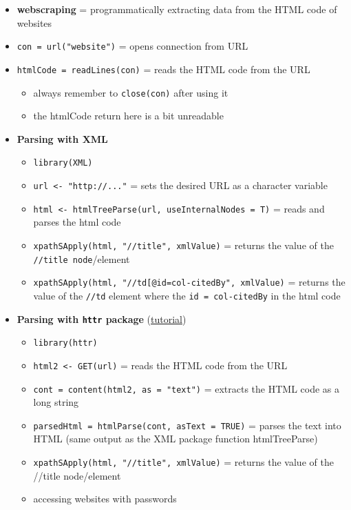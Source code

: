\documentclass[
]{article}
\providecommand{\tightlist}{%
  \setlength{\itemsep}{0pt}\setlength{\parskip}{0pt}}
\begin{document}
\begin{itemize}
\tightlist
\item
  \textbf{webscraping} = programmatically extracting data from the HTML
  code of websites
\item
  \texttt{con\ =\ url("website")} = opens connection from URL
\item
  \texttt{htmlCode\ =\ readLines(con)} = reads the HTML code from the
  URL

  \begin{itemize}
  \tightlist
  \item
    always remember to \texttt{close(con)} after using it
  \item
    the htmlCode return here is a bit unreadable
  \end{itemize}
\item
  \textbf{Parsing with XML}

  \begin{itemize}
  \tightlist
  \item
    \texttt{library(XML)}
  \item
    \texttt{url\ \textless{}-\ "http://..."} = sets the desired URL as a
    character variable
  \item
    \texttt{html\ \textless{}-\ htmlTreeParse(url,\ useInternalNodes\ =\ T)}
    = reads and parses the html code
  \item
    \texttt{xpathSApply(html,\ "//title",\ xmlValue)} = returns the
    value of the \texttt{//title\ node}/element
  \item
    \texttt{xpathSApply(html,\ "//td{[}@id=\textquotesingle{}col-citedBy\textquotesingle{}{]}",\ xmlValue)}
    = returns the value of the \texttt{//td} element where the
    \texttt{id\ =\ \textquotesingle{}col-citedBy\textquotesingle{}} in
    the html code
  \end{itemize}
\item
  \textbf{Parsing with \texttt{httr} package}
  (\href{http://cran.r-project.org/web/packages/httr/httr.pdf}{tutorial})

  \begin{itemize}
  \tightlist
  \item
    \texttt{library(httr)}
  \item
    \texttt{html2\ \textless{}-\ GET(url)} = reads the HTML code from
    the URL
  \item
    \texttt{cont\ =\ content(html2,\ as\ =\ "text")} = extracts the HTML
    code as a long string
  \item
    \texttt{parsedHtml\ =\ htmlParse(cont,\ asText\ =\ TRUE)} = parses
    the text into HTML (same output as the XML package function
    htmlTreeParse)
  \item
    \texttt{xpathSApply(html,\ "//title",\ xmlValue)} = returns the
    value of the //title node/element
  \item
    accessing websites with passwords


\end{itemize}
\end{itemize}
\end{document}
